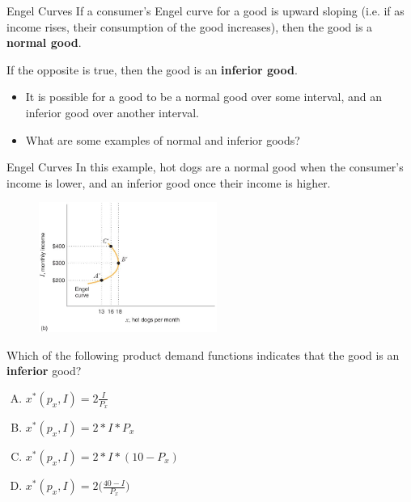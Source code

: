 \documentclass[12pt,t]{beamer}
\begin{document}
\begin{frame}{Engel Curves}
  If a consumer's Engel curve for a good is upward sloping (i.e. if as income rises, their consumption of the good increases), then the good is a \textbf{normal good}.

  \bigskip
  If the opposite is true, then the good is an \textbf{inferior good}.

  \bigskip\pause
  \begin{itemize}
    \item It is possible for a good to be a normal good over some interval, and an inferior good over another interval.

    \item What are some examples of normal and inferior goods?
  \end{itemize}
\end{frame}

\begin{frame}{Engel Curves}
In this example, hot dogs are a normal good when the consumer's income is lower, and an inferior good once their income is higher.
\begin{figure}
  \includegraphics[width=220px]{figures/fig5_4b.jpg}
\end{figure}
\end{frame}

\begin{frame}

  \bigskip 
  Which of the following product demand functions indicates that the good is an \textbf{inferior} good?

  \bigskip
  \begin{enumerate}[A)]
    \item $x^*(p_x, I) = 2\frac{I}{P_x}$
    \item $x^*(p_x, I) =  2*I*P_x$ 
    \item $x^*(p_x, I) =  2*I*(10-P_x)$
    \item $x^*(p_x, I) =  2\big(\frac{40-I}{P_x}\big)$
  \end{enumerate}
\end{frame}
\end{document}
